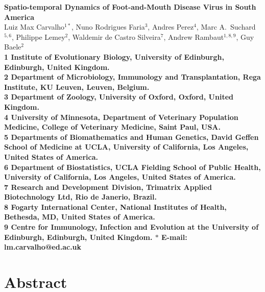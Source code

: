 \documentclass[10pt]{article}
\date{}
\begin{document}
\begin{flushleft}
{\Large
\textbf{Spatio-temporal Dynamics of Foot-and-Mouth Disease Virus in South America}
}
\\
Luiz Max Carvalho$^{1\ast}$,
Nuno Rodrigues Faria$^{3}$, %
Andres Perez$^{4}$,
Marc A.~Suchard$^{5,6}$,
Philippe Lemey$^{2}$,
Waldemir de Castro Silveira$^{7}$,
Andrew Rambaut$^{1,8,9}$,
Guy Baele$^{2}$
\\
\bf{1} Institute of Evolutionary Biology, University of Edinburgh, Edinburgh, United Kingdom.\\
\bf{2} Department of Microbiology, Immunology and Transplantation, Rega Institute, KU Leuven, Leuven, Belgium.\\
\bf{3} Department of Zoology, University of Oxford, Oxford, United Kingdom.\\
\bf{4} University of Minnesota, Department of Veterinary Population Medicine, College of Veterinary Medicine, Saint Paul, USA.\\
\bf{5} Departments of Biomathematics and Human Genetics, David Geffen School of Medicine at UCLA, University of California, Los Angeles,  United States of America.\\
\bf{6} Department of Biostatistics, UCLA Fielding School of Public Health, University of California, Los Angeles,  United States of America.\\
\bf{7} Research and Development Division, Trimatrix Applied Biotechnology Ltd, Rio de Janerio, Brazil.\\
\bf{8} Fogarty International Center, National Institutes of Health, Bethesda, MD,  United States of America.\\
\bf{9} Centre for Immunology, Infection and Evolution at the University of Edinburgh, Edinburgh, United Kingdom.
$\ast$ E-mail: lm.carvalho@ed.ac.uk
\end{flushleft}
\section*{Abstract}

\end{document}
